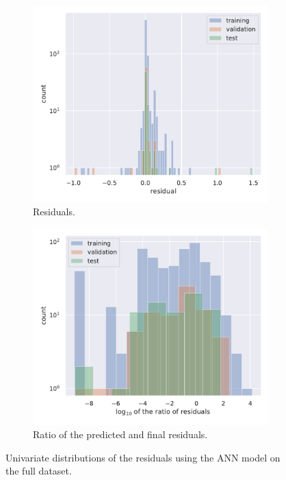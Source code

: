 \begin{figure}[htbp]
  \centering
  \begin{subfigure}[b]{0.45\linewidth}
    \centering
    \includegraphics[width=\linewidth]{img/lumps_ann_residual_histogram_compare}
    \caption{Residuals.}
  \end{subfigure}
  \hfill
  \begin{subfigure}[b]{0.45\linewidth}
    \centering
    \includegraphics[width=\linewidth]{img/lumps_ann_ratio_histogram_compare}
    \caption{Ratio of the predicted and final residuals.}
  \end{subfigure}
  \caption{Univariate distributions of the residuals using the ANN model on the full dataset.}
  \label{fig:lumps:fftann}
\end{figure}


